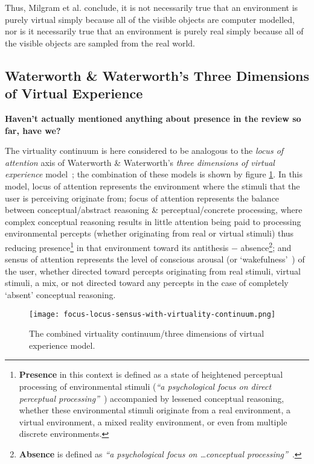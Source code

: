Thus, Milgram et al. conclude, it is not necessarily true that an environment is purely virtual simply because all of the visible objects are computer modelled, nor is it necessarily true that an environment is purely real simply because all of the visible objects are sampled from the real world.


\subsection{Waterworth \& Waterworth's Three Dimensions of Virtual Experience}
\newcommand{\presencefootnote}{\footnote{\textbf{Presence} in this context is defined as a state of heightened perceptual processing of environmental stimuli (\textit{``a psychological focus on direct perceptual processing''}~\cite{Waterworth2001}) accompanied by lessened conceptual reasoning, whether these environmental stimuli originate from a real environment, a virtual environment, a mixed reality environment, or even from multiple discrete environments.}}

\newcommand{\absencefootnote}{\footnote{\textbf{Absence} is defined as \textit{``a psychological focus on \ldots conceptual processing''}~\cite{Waterworth2001}.}}

\textbf{Haven't actually mentioned anything about presence in the review so far, have we?}

The virtuality continuum is here considered to be analogous to the \textit{locus of attention} axis of Waterworth \& Waterworth's \textit{three dimensions of virtual experience} model~\cite{Waterworth2001}; the combination of these models is shown by figure \ref{focus-locus-sensus-with-virtuality-continuum}. In this model, locus of attention represents the environment where the stimuli that the user is perceiving originate from; focus of attention represents the balance between conceptual/abstract reasoning \& perceptual/concrete processing, where complex conceptual reasoning results in little attention being paid to processing environmental percepts (whether originating from real or virtual stimuli) thus reducing presence\presencefootnote{} in that environment toward its antithesis $-$ absence\absencefootnote{}; and sensus of attention represents the level of conscious arousal (or `wakefulness'~\cite{Laureys2009}) of the user, whether directed toward percepts originating from real stimuli, virtual stimuli, a mix, or not directed toward any percepts in the case of completely `absent' conceptual reasoning.

\begin{figure}[h]
	\begin{center}
		\texttt{[image: focus-locus-sensus-with-virtuality-continuum.png]}
		\caption{The combined virtuality continuum/three dimensions of virtual experience model.}
		\label{focus-locus-sensus-with-virtuality-continuum}
	\end{center}	
\end{figure}

